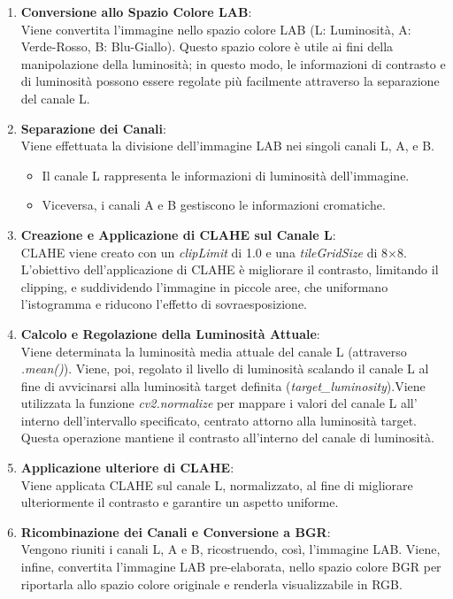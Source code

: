 \documentclass[12pt,a4paper,openright,twoside]{book}
\begin{document}
\begin{enumerate}
\item \textbf{Conversione allo Spazio Colore LAB}:\\
Viene convertita l’immagine nello spazio colore LAB (L: Luminosità, A: Verde-Rosso, B: Blu-Giallo). Questo spazio colore è utile ai fini della manipolazione della luminosità; in questo modo, le informazioni di contrasto e di luminosità possono essere regolate più facilmente attraverso la separazione del canale L.
\item \textbf{Separazione dei Canali}:\\
Viene effettuata la divisione dell’immagine LAB nei singoli canali L, A, e B. 
\begin{itemize}
\item Il canale L rappresenta le informazioni di luminosità dell’immagine.
\item Viceversa, i canali A e B gestiscono le informazioni cromatiche.
\end{itemize}
\item \textbf{Creazione e Applicazione di CLAHE sul Canale L}:\\
CLAHE viene creato con un {\itshape clipLimit} di 1.0 e una {\itshape tileGridSize} di 8×8. L'obiettivo dell'applicazione di CLAHE è migliorare il contrasto, limitando il clipping, e suddividendo l'immagine in piccole aree, che uniformano l'istogramma e riducono l'effetto di sovraesposizione.
\item \textbf{Calcolo e Regolazione della Luminosità Attuale}:\\
Viene determinata la luminosità media attuale del canale L (attraverso {\itshape .mean()}). Viene, poi, regolato il livello di luminosità scalando il canale L al fine di avvicinarsi alla luminosità target definita ({\itshape target\_luminosity}).Viene utilizzata la funzione {\itshape cv2.normalize} per mappare i valori del canale L all’ interno dell'intervallo specificato, centrato attorno alla luminosità target. Questa operazione mantiene il contrasto all'interno del canale di luminosità.
\item \textbf{Applicazione ulteriore di CLAHE}:\\
Viene applicata CLAHE sul canale L, normalizzato, al fine di migliorare ulteriormente il contrasto e garantire un aspetto uniforme.
\item \textbf{Ricombinazione dei Canali e Conversione a BGR}:\\
Vengono riuniti i canali L, A e B, ricostruendo, così, l’immagine LAB. Viene, infine, convertita l’immagine LAB pre-elaborata, nello spazio colore BGR per riportarla allo spazio colore originale e renderla visualizzabile in RGB.
\end{enumerate}
\end{document}
